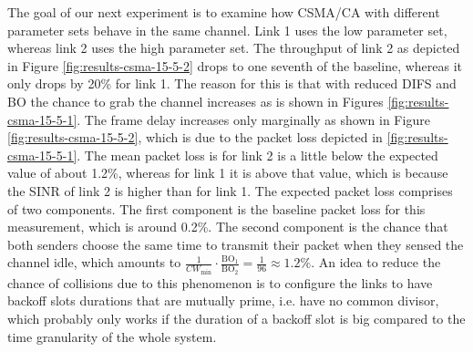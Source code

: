 The goal of our next experiment is to examine how CSMA/CA with different parameter sets behave in the same channel. Link 1 uses the low parameter set, whereas link 2 uses the high parameter set. The throughput of link 2 as depicted in Figure \ref{fig:results-csma-15-5-2} drops to one seventh of the baseline, whereas it only drops by 20\% for link 1. The reason for this is that with reduced DIFS and BO the chance to grab the channel increases as is shown in Figures \ref{fig:results-csma-15-5-1}. The frame delay increases only marginally as shown in Figure \ref{fig:results-csma-15-5-2}, which is due to the packet loss depicted in \ref{fig:results-csma-15-5-1}. The mean packet loss is for link 2 is a little below the expected value of about 1.2\%, whereas for link 1 it is above that value, which is because the SINR of link 2 is higher than for link 1. The expected packet loss comprises of two components. The first component is the baseline packet loss for this measurement, which is around 0.2\%. The second component is the chance that both senders choose the same time to transmit their packet when they sensed the channel idle, which amounts to $ \frac{1}{CW_\text{min}} \cdot \frac{\text{BO}_1}{\text{BO}_2} = \frac{1}{96} \approx 1.2\% $. An idea to reduce the chance of collisions due to this phenomenon is to configure the links to have backoff slots durations that are mutually prime, i.e. have no common divisor, which probably only works if the duration of a backoff slot is big compared to the time granularity of the whole system. 

